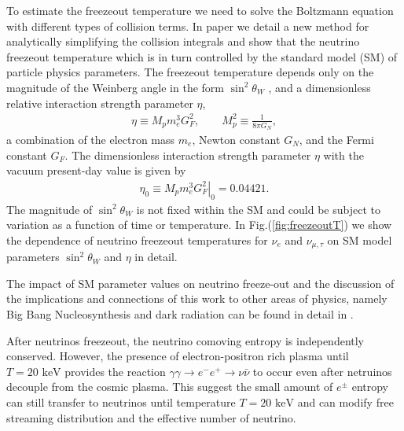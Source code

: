 \documentclass[universe,article,submit,moreauthors,pdftex,a4paper]{Definitions/mdpi}
\newcommand{\keV}{\text{ keV}}
\begin{document}
 To estimate the freezeout temperature we need to solve the Boltzmann equation with different types of collision terms. In paper \cite{Birrell:2014uka} we detail a new method for analytically simplifying the collision integrals and show that the neutrino freezeout temperature which is in turn controlled by the standard model (SM) of particle physics  parameters. The freezeout temperature depends only on the magnitude of the Weinberg angle in the form $\sin^2\theta_W$ , and a dimensionless relative interaction strength parameter $\eta$,
\begin{align}
\eta\equiv M_p m_e^3 G_F^2, \qquad M_p^2\equiv \frac{1}{8\pi G_N}, \end{align}
a combination of  the electron mass $m_e$, Newton constant $G_N$, and the Fermi constant $G_F$. The dimensionless interaction strength parameter $\eta$ with the vacuum present-day value is given by
\begin{align}
\eta_0\equiv \left.M_p m_e^3 G_F^2\right|_0  = 0.04421 .
\end{align}
The magnitude of  $\sin^2\theta_W$ is not fixed within the SM and  could be subject to variation as a function of time or temperature. In Fig.(\ref{fig:freezeoutT}) we show the dependence of neutrino freezeout temperatures for $\nu_e$ and $\nu_{\mu,\tau}$ on SM model parameters  $\sin^2\theta_W$ and $\eta$ in detail.

 The impact of SM parameter values on neutrino freeze-out and the discussion of the implications and connections of this work to other areas of physics, namely Big Bang Nucleosynthesis and dark radiation can be found in detail in \cite{Birrell:2014uka}.


 After neutrinos freezeout, the neutrino comoving entropy is independently conserved. However, the presence of electron-positron rich plasma until $T=20\keV$ provides the reaction $\gamma\gamma\to e^-e^+\to\nu\bar{\nu}$ to occur even after netruinos decouple from the cosmic plasma. This suggest the small amount of $e^\pm$ entropy can still transfer to neutrinos until temperature $T=20\keV$ and can modify free streaming distribution and the effective number of neutrino.
\end{document}
